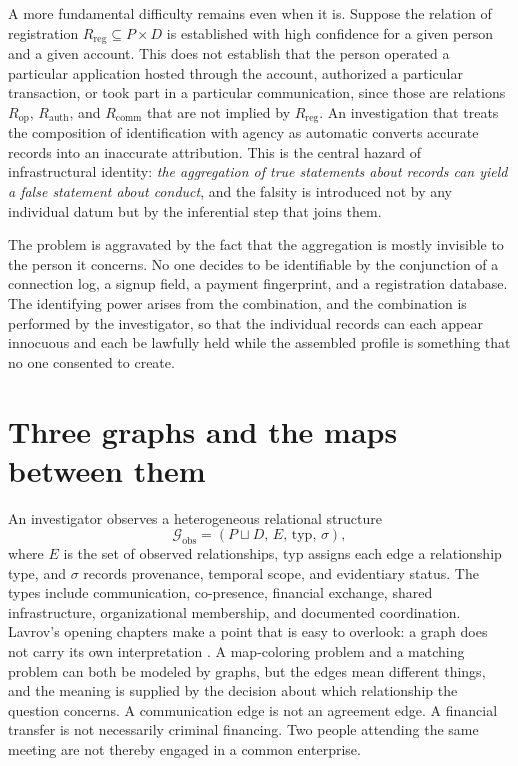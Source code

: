 \documentclass[11pt]{article}
\theoremstyle{definition}
\theoremstyle{remark}
\begin{document}
A more fundamental difficulty remains even when it is. Suppose the relation of registration $R_{\mathrm{reg}} \subseteq P \times D$ is established with high confidence for a given person and a given account. This does not establish that the person operated a particular application hosted through the account, authorized a particular transaction, or took part in a particular communication, since those are relations $R_{\mathrm{op}}$, $R_{\mathrm{auth}}$, and $R_{\mathrm{comm}}$ that are not implied by $R_{\mathrm{reg}}$. An investigation that treats the composition of identification with agency as automatic converts accurate records into an inaccurate attribution. This is the central hazard of infrastructural identity: \emph{the aggregation of true statements about records can yield a false statement about conduct}, and the falsity is introduced not by any individual datum but by the inferential step that joins them.

The problem is aggravated by the fact that the aggregation is mostly invisible to the person it concerns. No one decides to be identifiable by the conjunction of a connection log, a signup field, a payment fingerprint, and a registration database. The identifying power arises from the combination, and the combination is performed by the investigator, so that the individual records can each appear innocuous and each be lawfully held while the assembled profile is something that no one consented to create.

\section{Three graphs and the maps between them}

An investigator observes a heterogeneous relational structure
\[
\mathcal{G}_{\mathrm{obs}} = (P \sqcup D,\, E,\, \mathrm{typ},\, \sigma),
\]
where $E$ is the set of observed relationships, $\mathrm{typ}$ assigns each edge a relationship type, and $\sigma$ records provenance, temporal scope, and evidentiary status. The types include communication, co-presence, financial exchange, shared infrastructure, organizational membership, and documented coordination. Lavrov's opening chapters make a point that is easy to overlook: a graph does not carry its own interpretation \cite{lavrov2026}. A map-coloring problem and a matching problem can both be modeled by graphs, but the edges mean different things, and the meaning is supplied by the decision about which relationship the question concerns. A communication edge is not an agreement edge. A financial transfer is not necessarily criminal financing. Two people attending the same meeting are not thereby engaged in a common enterprise.
\end{document}
